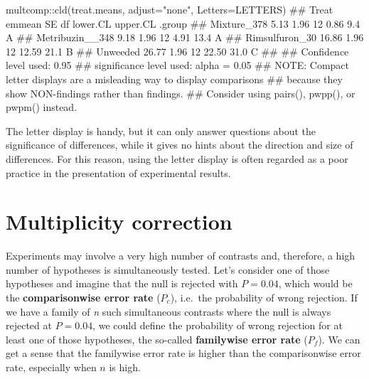 \documentclass[a4paper,12pt,oneside]{book}
\newenvironment{Shaded}{\begin{snugshade}}{\end{snugshade}}
\newcommand{\SpecialCharTok}[1]{#1}
\newcommand{\StringTok}[1]{#1}
\newcommand{\DocumentationTok}[1]{#1}
\newcommand{\FunctionTok}[1]{#1}
\newcommand{\AttributeTok}[1]{#1}
\newcommand{\AlertTok}[1]{#1}
\newcommand{\NormalTok}[1]{#1}
\begin{document}
\begin{Shaded}
\begin{Highlighting}[]
\NormalTok{multcomp}\SpecialCharTok{::}\FunctionTok{cld}\NormalTok{(treat.means, }\AttributeTok{adjust=}\StringTok{"none"}\NormalTok{, }\AttributeTok{Letters=}\NormalTok{LETTERS)}
\DocumentationTok{\#\#  Treat           emmean   SE df lower.CL upper.CL .group}
\DocumentationTok{\#\#  Mixture\_378       5.13 1.96 12     0.86      9.4  A    }
\DocumentationTok{\#\#  Metribuzin\_\_348   9.18 1.96 12     4.91     13.4  A    }
\DocumentationTok{\#\#  Rimsulfuron\_30   16.86 1.96 12    12.59     21.1   B   }
\DocumentationTok{\#\#  Unweeded         26.77 1.96 12    22.50     31.0    C  }
\DocumentationTok{\#\# }
\DocumentationTok{\#\# Confidence level used: 0.95 }
\DocumentationTok{\#\# significance level used: alpha = 0.05 }
\DocumentationTok{\#\# }\AlertTok{NOTE}\DocumentationTok{: Compact letter displays are a misleading way to display comparisons}
\DocumentationTok{\#\#       because they show NON{-}findings rather than findings.}
\DocumentationTok{\#\#       Consider using \textquotesingle{}pairs()\textquotesingle{}, \textquotesingle{}pwpp()\textquotesingle{}, or \textquotesingle{}pwpm()\textquotesingle{} instead.}
\end{Highlighting}
\end{Shaded}

The letter display is handy, but it can only answer questions about the significance of differences, while it gives no hints about the direction and size of differences. For this reason, using the letter display is often regarded as a poor practice in the presentation of experimental results.

\hypertarget{multiplicity-correction}{%
\section{Multiplicity correction}\label{multiplicity-correction}}

Experiments may involve a very high number of contrasts and, therefore, a high number of hypotheses is simultaneously tested. Let's consider one of those hypotheses and imagine that the null is rejected with \(P = 0.04\), which would be the \textbf{comparisonwise error rate} (\(P_c\)), i.e.~the probability of wrong rejection. If we have a family of \emph{n} such simultaneous contrasts where the null is always rejected at \(P = 0.04\), we could define the probability of wrong rejection for at least one of those hypotheses, the so-called \textbf{familywise error rate} (\(P_f\)). We can get a sense that the familywise error rate is higher than the comparisonwise error rate, especially when \(n\) is high.
\end{document}
